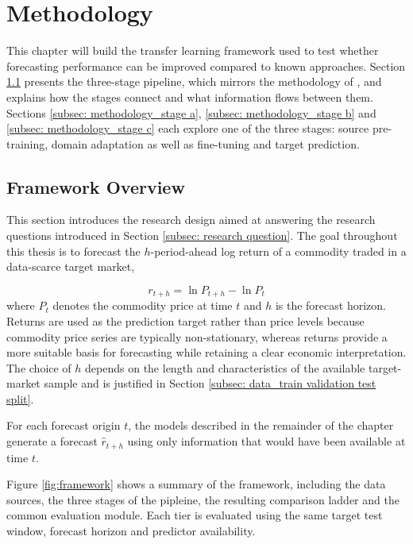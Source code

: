 
\section{Methodology} \label{sec: methodology}
This chapter will build the transfer learning framework used to test whether forecasting performance can be improved compared to known approaches. Section \ref{subsec: methodology_framework overview} presents the three-stage pipeline, which mirrors the methodology of \textcite{mashettyTransferLearningCrossMarket2025a}, and explains how the stages connect and what information flows between them. Sections \ref{subsec: methodology_stage a}, \ref{subsec: methodology_stage b} and \ref{subsec: methodology_stage c} each explore one of the three stages: source pre-training, domain adaptation as well as fine-tuning and target prediction.

\subsection{Framework Overview} \label{subsec: methodology_framework overview}
This section introduces the research design aimed at answering the research questions introduced in Section \ref{subsec: research question}. The goal throughout this thesis is to forecast the $h$-period-ahead log return of a commodity traded in a data-scarce target market, 

\begin{equation}
    r_{t+h}=\ln P_{t+h}-\ln P_{t}
\end{equation}
where $P_t$ denotes the commodity price at time $t$ and $h$ is the forecast horizon. Returns are used as the prediction target rather than price levels because commodity price series are typically non-stationary, whereas returns provide a more suitable basis for forecasting while retaining a clear economic interpretation. The choice of $h$ depends on the length and characteristics of the available target-market sample and is justified in Section \ref{subsec: data_train validation test split}.

For each forecast origin $t$, the models described in the remainder of the chapter generate a forecast $\hat r_{t+h}$ using only information that would have been available at time $t$.

Figure \ref{fig:framework} shows a summary of the framework, including the data sources, the three stages of the pipleine, the resulting comparison ladder and the common evaluation module. Each tier is evaluated using the same target test window, forecast horizon and predictor availability. 

